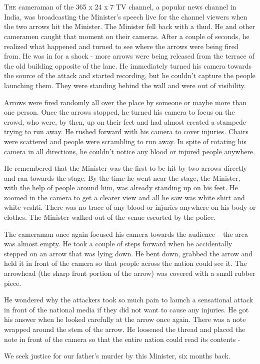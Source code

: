 \chapter{}

\lettrine{T}{he} cameraman of the 365 x 24 x 7 TV channel, a popular news channel in India,
was broadcasting the Minister's speech live for the channel viewers when the two
arrows hit the Minister. The Minister fell back with a thud. He and other
cameramen caught that moment on their cameras. After a couple of seconds, he
realized what happened and turned to see where the arrows were being fired from.
He was in for a shock - more arrows were being released from the terrace of the
old building opposite of the lane. He immediately turned his camera towards the
source of the attack and started recording, but he couldn't capture the people
launching them. They were standing behind the wall and were out of visibility.

Arrows were fired randomly all over the place by someone or maybe more than one
person. Once the arrows stopped, he turned his camera to focus on the crowd, who
were, by then, up on their feet and had almost created a stampede trying to run
away. He rushed forward with his camera to cover injuries. Chairs were scattered
and people were scrambling to run away. In spite of rotating his camera in all
directions, he couldn't notice any blood or injured people anywhere.

He remembered that the Minister was the first to be hit by two arrows directly
and ran towards the stage. By the time he went near the stage, the Minister,
with the help of people around him, was already standing up on his feet. He
zoomed in the camera to get a clearer view and all he saw was white shirt and
white veshti. There was no trace of any blood or injuries anywhere on his body
or clothes. The Minister walked out of the venue escorted by the police.

The cameraman once again focused his camera towards the audience – the area was
almost empty. He took a couple of steps forward when he accidentally stepped on
an arrow that was lying down. He bent down, grabbed the arrow and held it in
front of the camera so that people across the nation could see it. The arrowhead
(the sharp front portion of the arrow) was covered with a small rubber piece.

He wondered why the attackers took so much pain to launch a sensational attack
in front of the national media if they did not want to cause any injuries. He
got his answer when he looked carefully at the arrow once again. There was a
note wrapped around the stem of the arrow. He loosened the thread and placed the
note in front of the camera so that the entire nation could read its contents -

We seek justice for our father's murder by this Minister, six months back.